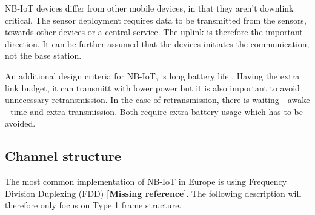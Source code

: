 \documentclass[10pt,a4paper,titlepage,twoside]{article}
\newcommand{\note}[1]{\textbf{[\color{ymablue}#1}]}
\newcommand{\point}[1]{\textbf{\color{ymared} #1}}
\begin{document}
NB-IoT devices differ from other mobile devices, in that they aren't downlink critical. The sensor deployment requires data to be transmitted from the sensors, towards other devices or a central service. The uplink is therefore the important direction. It can be further assumed that the devices initiates the communication, not the base station.

An additional design criteria for NB-IoT, is long battery life \cite{wang}. Having the extra link budget, it can transmitt with lower power but it is also important to avoid unnecessary retransmission. In the case of retransmission, there is waiting - awake - time and extra transmission. Both require extra battery usage which has to be avoided.





\subsection{Channel structure}

The most common implementation of NB-IoT in Europe is using Frequency Division Duplexing (FDD) \note{Missing reference}. The following description will therefore only focus on Type 1 frame structure.
\end{document}

